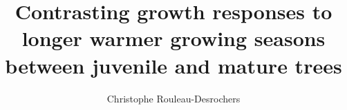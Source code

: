\documentclass[gpscopy,onehalfspacing,11pt]{ubcdiss}
\title{Contrasting growth responses to longer warmer growing seasons between juvenile and mature trees}
\author{Christophe Rouleau-Desrochers}
\begin{document}

\maketitle

\makecommitteepage


\cleardoublepage


\cleardoublepage


\cleardoublepage

\tableofcontents
\cleardoublepage	%

\listoftables
\cleardoublepage	%

\listoffigures
\cleardoublepage	%



\textspacing		%




\mainmatter

\acresetall	%





%
%
%
%
%
\end{document}
